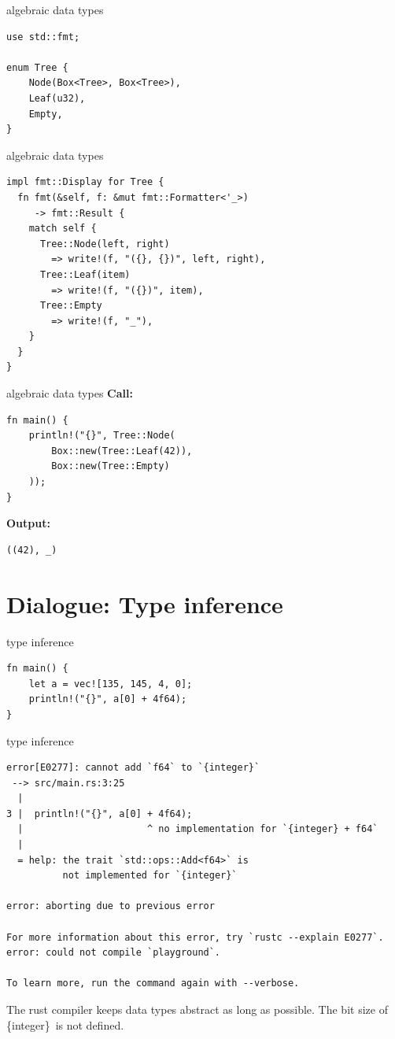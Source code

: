 \documentclass{beamer}
\newcommand\code[1]{\,{\color[HTML]{884400}#1}\,}
\begin{document}
\begin{frame}[fragile]{algebraic data types}
  \begin{verbatim}
use std::fmt;

enum Tree {
    Node(Box<Tree>, Box<Tree>),
    Leaf(u32),
    Empty,
}
  \end{verbatim}
\end{frame}

\begin{frame}[fragile]{algebraic data types}
  \begin{verbatim}
impl fmt::Display for Tree {
  fn fmt(&self, f: &mut fmt::Formatter<'_>)
     -> fmt::Result {
    match self {
      Tree::Node(left, right)
        => write!(f, "({}, {})", left, right),
      Tree::Leaf(item)
        => write!(f, "({})", item),
      Tree::Empty
        => write!(f, "_"),
    }
  }
}
  \end{verbatim}
\end{frame}

\begin{frame}[fragile]{algebraic data types}
  \textbf{Call:}
  \begin{verbatim}
fn main() {
    println!("{}", Tree::Node(
        Box::new(Tree::Leaf(42)),
        Box::new(Tree::Empty)
    ));
}
  \end{verbatim}

  \textbf{Output:}
  \begin{verbatim}
((42), _)
  \end{verbatim}
\end{frame}

\section{Dialogue: Type inference}

\begin{frame}[fragile]{type inference}
  \begin{verbatim}
fn main() {
    let a = vec![135, 145, 4, 0];
    println!("{}", a[0] + 4f64);
}
  \end{verbatim}
\end{frame}

\begin{frame}[fragile]{type inference}
  \begin{verbatim}
error[E0277]: cannot add `f64` to `{integer}`
 --> src/main.rs:3:25
  |
3 |  println!("{}", a[0] + 4f64);
  |                      ^ no implementation for `{integer} + f64`
  |
  = help: the trait `std::ops::Add<f64>` is
          not implemented for `{integer}`

error: aborting due to previous error

For more information about this error, try `rustc --explain E0277`.
error: could not compile `playground`.

To learn more, run the command again with --verbose.
  \end{verbatim}
  The rust compiler keeps data types abstract as long as possible. The bit size of \code{\{integer\}} is not defined.
\end{frame}
\end{document}
